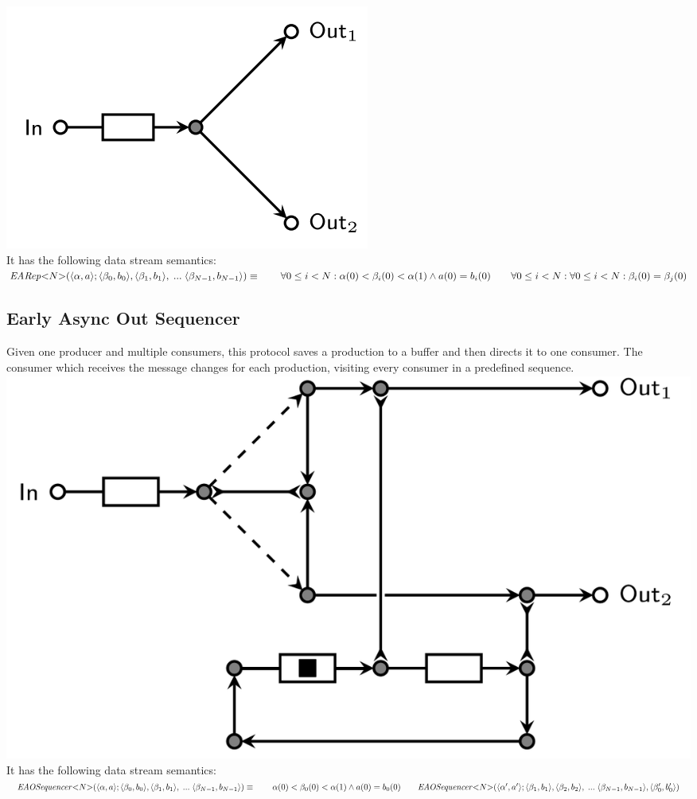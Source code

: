 \includegraphics[]{img/EARep.png}\\
%
It has the following data stream semantics:\\
%
$
\mathit{EARep}{<}N{>}(\langle \alpha, a \rangle ; \langle \beta_0, b_0 \rangle, \langle \beta_1, b_1 \rangle,\; ... \; \langle \beta_{N-1}, b_{N-1} \rangle) \equiv \\
\hphantom \qquad \forall 0 \leq i < N : \alpha(0) < \beta_i(0) < \alpha(1) \land a(0) = b_i(0) \\
\hphantom \qquad\forall 0 \leq i < N : \forall 0 \leq i < N : \beta_i(0) = \beta_j(0)
$\\

\subsection{Early Async Out Sequencer}
Given one producer and multiple consumers, this protocol saves a production to a buffer and then directs it to one consumer. The consumer which receives the message changes for each production, visiting every consumer in a predefined sequence.\\

\includegraphics[]{img/EAOSeq.png}\\
%
It has the following data stream semantics:\\
%
$
\mathit{EAOSequencer}{<}N{>}(\langle \alpha, a \rangle;\langle \beta_0, b_0 \rangle, \langle \beta_1, b_1 \rangle,\;...\; \langle \beta_{N-1}, b_{N-1} \rangle) \equiv \\
\hphantom \qquad \alpha(0) < \beta_0(0) < \alpha(1) \land a(0) = b_0(0) \\
\hphantom \qquad \mathit{EAOSequencer}{<}N{>}(\langle \alpha', a' \rangle; \langle \beta_1, b_1 \rangle,\langle \beta_2, b_2 \rangle,\;...\; \langle \beta_{N-1}, b_{N-1} \rangle, \langle \beta_0', b_0' \rangle)
$
